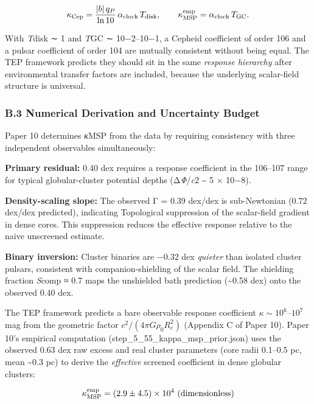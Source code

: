 \documentclass[
]{article}
\begin{document}
\begin{equation}
\kappa_{\rm Cep} = \frac{|b|\,q_P}{\ln 10}\,\alpha_{\rm clock}\,T_{\rm disk} , \qquad
\kappa_{\rm MSP}^{\rm emp} = \alpha_{\rm clock}\,T_{\rm GC} .
\end{equation}

With \emph{T}disk ∼ 1 and \emph{T}GC ∼ 10−2--10−1, a Cepheid coefficient
of order 106 and a pulsar coefficient of order 104 are mutually
consistent without being equal. The TEP framework predicts they should
sit in the same \emph{response hierarchy} after environmental transfer
factors are included, because the underlying scalar-field structure is
universal.

\subsubsection{B.3 Numerical Derivation and Uncertainty
Budget}\label{b.3-numerical-derivation-and-uncertainty-budget}

Paper 10 determines \emph{κ}MSP from the data by requiring consistency
with three independent observables simultaneously:

\textbf{Primary residual:} 0.40 dex requires a response coefficient in
the 106--107 range for typical globular-cluster potential depths
(Δ\emph{Φ}/\emph{c}2 \textasciitilde{} 5 × 10−8).

\textbf{Density-scaling slope:} The observed Γ = 0.39 dex/dex is
sub-Newtonian (0.72 dex/dex predicted), indicating Topological
suppression of the scalar-field gradient in dense cores. This
suppression reduces the effective response relative to the naive
unscreened estimate.

\textbf{Binary inversion:} Cluster binaries are −0.32 dex \emph{quieter}
than isolated cluster pulsars, consistent with companion-shielding of
the scalar field. The shielding fraction \emph{S}comp ≈ 0.7 maps the
unshielded bath prediction (\textasciitilde0.58 dex) onto the observed
0.40 dex.

The TEP framework predicts a bare observable response coefficient
\(\kappa \sim 10^6\)--\(10^7\) mag from the geometric factor
\(c^2/(4\pi G \rho_0 R_c^2)\) (Appendix C of Paper 10). Paper 10's
empirical computation (step\_5\_55\_kappa\_msp\_prior.json) uses the
observed 0.63 dex raw excess and real cluster parameters (core radii
0.1--0.5 pc, mean \textasciitilde0.3 pc) to derive the \emph{effective}
screened coefficient in dense globular clusters:

\begin{equation}
\kappa_{\rm MSP}^{\rm emp} = (2.9 \pm 4.5) \times 10^4\ {\rm (dimensionless)}
\end{equation}
\end{document}
